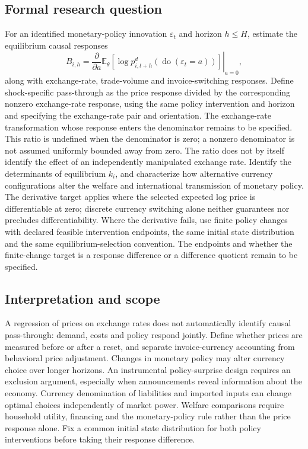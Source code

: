 \documentclass[11pt,a4paper]{article}
\begin{document}
\subsection*{Formal research question}
For an identified monetary-policy innovation $\varepsilon_t$ and horizon $h\le H$, estimate the equilibrium causal responses
\[
 B_{i,h}=\left.\frac{\partial}{\partial a}
 \mathbb E_\theta[\log p_{i,t+h}^{d}(\operatorname{do}(\varepsilon_t=a))]
 \right|_{a=0},
\]
along with exchange-rate, trade-volume and invoice-switching responses. Define shock-specific pass-through as the price response divided by the corresponding nonzero exchange-rate response, using the same policy intervention and horizon and specifying the exchange-rate pair and orientation. The exchange-rate transformation whose response enters the denominator remains to be specified. This ratio is undefined when the denominator is zero; a nonzero denominator is not assumed uniformly bounded away from zero. The ratio does not by itself identify the effect of an independently manipulated exchange rate. Identify the determinants of equilibrium $k_i$, and characterize how alternative currency configurations alter the welfare and international transmission of monetary policy. The derivative target applies where the selected expected log price is differentiable at zero; discrete currency switching alone neither guarantees nor precludes differentiability. Where the derivative fails, use finite policy changes with declared feasible intervention endpoints, the same initial state distribution and the same equilibrium-selection convention. The endpoints and whether the finite-change target is a response difference or a difference quotient remain to be specified.

\subsection*{Interpretation and scope}
A regression of prices on exchange rates does not automatically identify causal pass-through: demand, costs and policy respond jointly. Define whether prices are measured before or after a reset, and separate invoice-currency accounting from behavioral price adjustment. Changes in monetary policy may alter currency choice over longer horizons. An instrumental policy-surprise design requires an exclusion argument, especially when announcements reveal information about the economy. Currency denomination of liabilities and imported inputs can change optimal choices independently of market power. Welfare comparisons require household utility, financing and the monetary-policy rule rather than the price response alone. Fix a common initial state distribution for both policy interventions before taking their response difference.
\end{document}
